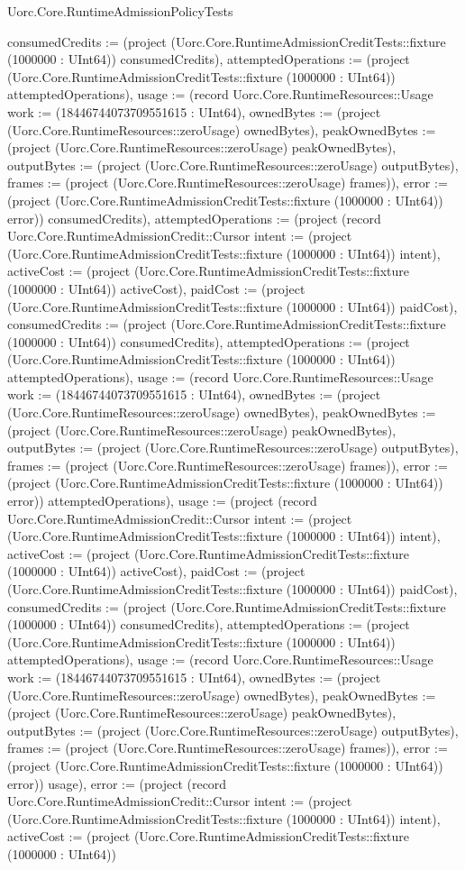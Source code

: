 \begin{lexlean}{Uorc.Core.RuntimeAdmissionPolicyTests}
\begin{semanticmodule}
{consumedCredits := (project (Uorc.Core.RuntimeAdmissionCreditTests::fixture (1000000 : UInt64)) consumedCredits), attemptedOperations := (project (Uorc.Core.RuntimeAdmissionCreditTests::fixture (1000000 : UInt64)) attemptedOperations), usage := (record Uorc.Core.RuntimeResources::Usage {work := (18446744073709551615 : UInt64), ownedBytes := (project (Uorc.Core.RuntimeResources::zeroUsage) ownedBytes), peakOwnedBytes := (project (Uorc.Core.RuntimeResources::zeroUsage) peakOwnedBytes), outputBytes := (project (Uorc.Core.RuntimeResources::zeroUsage) outputBytes), frames := (project (Uorc.Core.RuntimeResources::zeroUsage) frames)}), error := (project (Uorc.Core.RuntimeAdmissionCreditTests::fixture (1000000 : UInt64)) error)}) consumedCredits), attemptedOperations := (project (record Uorc.Core.RuntimeAdmissionCredit::Cursor {intent := (project (Uorc.Core.RuntimeAdmissionCreditTests::fixture (1000000 : UInt64)) intent), activeCost := (project (Uorc.Core.RuntimeAdmissionCreditTests::fixture (1000000 : UInt64)) activeCost), paidCost := (project (Uorc.Core.RuntimeAdmissionCreditTests::fixture (1000000 : UInt64)) paidCost), consumedCredits := (project (Uorc.Core.RuntimeAdmissionCreditTests::fixture (1000000 : UInt64)) consumedCredits), attemptedOperations := (project (Uorc.Core.RuntimeAdmissionCreditTests::fixture (1000000 : UInt64)) attemptedOperations), usage := (record Uorc.Core.RuntimeResources::Usage {work := (18446744073709551615 : UInt64), ownedBytes := (project (Uorc.Core.RuntimeResources::zeroUsage) ownedBytes), peakOwnedBytes := (project (Uorc.Core.RuntimeResources::zeroUsage) peakOwnedBytes), outputBytes := (project (Uorc.Core.RuntimeResources::zeroUsage) outputBytes), frames := (project (Uorc.Core.RuntimeResources::zeroUsage) frames)}), error := (project (Uorc.Core.RuntimeAdmissionCreditTests::fixture (1000000 : UInt64)) error)}) attemptedOperations), usage := (project (record Uorc.Core.RuntimeAdmissionCredit::Cursor {intent := (project (Uorc.Core.RuntimeAdmissionCreditTests::fixture (1000000 : UInt64)) intent), activeCost := (project (Uorc.Core.RuntimeAdmissionCreditTests::fixture (1000000 : UInt64)) activeCost), paidCost := (project (Uorc.Core.RuntimeAdmissionCreditTests::fixture (1000000 : UInt64)) paidCost), consumedCredits := (project (Uorc.Core.RuntimeAdmissionCreditTests::fixture (1000000 : UInt64)) consumedCredits), attemptedOperations := (project (Uorc.Core.RuntimeAdmissionCreditTests::fixture (1000000 : UInt64)) attemptedOperations), usage := (record Uorc.Core.RuntimeResources::Usage {work := (18446744073709551615 : UInt64), ownedBytes := (project (Uorc.Core.RuntimeResources::zeroUsage) ownedBytes), peakOwnedBytes := (project (Uorc.Core.RuntimeResources::zeroUsage) peakOwnedBytes), outputBytes := (project (Uorc.Core.RuntimeResources::zeroUsage) outputBytes), frames := (project (Uorc.Core.RuntimeResources::zeroUsage) frames)}), error := (project (Uorc.Core.RuntimeAdmissionCreditTests::fixture (1000000 : UInt64)) error)}) usage), error := (project (record Uorc.Core.RuntimeAdmissionCredit::Cursor {intent := (project (Uorc.Core.RuntimeAdmissionCreditTests::fixture (1000000 : UInt64)) intent), activeCost := (project (Uorc.Core.RuntimeAdmissionCreditTests::fixture (1000000 : UInt64)) }
\end{semanticmodule}
\end{lexlean}
